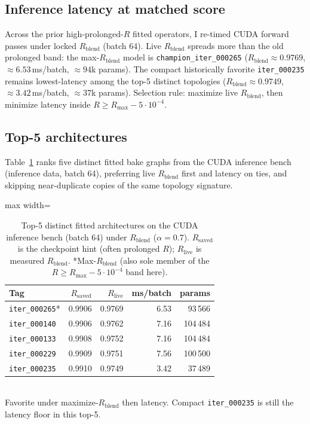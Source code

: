 \subsection{Inference latency at matched score}
\label{sec:inference-latency}
Across the prior high-prolonged-$R$ fitted operators, I re-timed CUDA forward passes under locked $R_{\mathrm{blend}}$ (batch 64).
Live $R_{\mathrm{blend}}$ spreads more than the old prolonged band: the max-$R_{\mathrm{blend}}$ model is
\texttt{champion\_iter\_000265} ($R_{\mathrm{blend}}{\approx}0.9769$, $\approx 6.53$\,ms/batch, $\approx 94$k params).
The compact historically favorite \texttt{iter\_000235} remains lowest-latency among the top-5 distinct topologies
($R_{\mathrm{blend}}{\approx}0.9749$, $\approx 3.42$\,ms/batch, $\approx 37$k params).
Selection rule: maximize live $R_{\mathrm{blend}}$, then minimize latency inside $R\ge R_{\max}-5\cdot10^{-4}$.

\subsection{Top-5 architectures}
\label{sec:top5-arch}
Table~\ref{tab:top5} ranks five distinct fitted bake graphs from the CUDA inference bench
(inference data, batch 64), preferring live $R_{\mathrm{blend}}$ first and latency on ties,
and skipping near-duplicate copies of the same topology signature.

\begin{table}[htbp]
  \centering
  \caption{Top-5 distinct fitted architectures on the CUDA inference bench (batch 64) under $R_{\mathrm{blend}}$ ($\alpha{=}0.7$).
  $R_{\mathrm{saved}}$ is the checkpoint hint (often prolonged $R$); $R_{\mathrm{live}}$ is measured $R_{\mathrm{blend}}$.
  *Max-$R_{\mathrm{blend}}$ (also sole member of the $R\ge R_{\max}-5\cdot10^{-4}$ band here).}
  \label{tab:top5}
  \setlength{\tabcolsep}{3pt}
  \begin{adjustbox}{max width=\columnwidth}
\begin{tabular}{@{}lrrrr@{}}
    \toprule
    Tag & $R_{\mathrm{saved}}$ & $R_{\mathrm{live}}$ & ms/batch & params \\
    \midrule
    \texttt{iter\_000265}* & 0.9906 & 0.9769 & 6.53 & 93\,566 \\
    \texttt{iter\_000140} & 0.9906 & 0.9762 & 7.16 & 104\,484 \\
    \texttt{iter\_000133} & 0.9908 & 0.9752 & 7.16 & 104\,484 \\
    \texttt{iter\_000229} & 0.9909 & 0.9751 & 7.56 & 100\,500 \\
    \texttt{iter\_000235} & 0.9910 & 0.9749 & 3.42 & 37\,489 \\
    \bottomrule
  \end{tabular}
\end{adjustbox}\\[0.4em]
  {\footnotesize *Favorite under maximize-$R_{\mathrm{blend}}$ then latency. Compact \texttt{iter\_000235} is still the latency floor in this top-5.}
\end{table}

